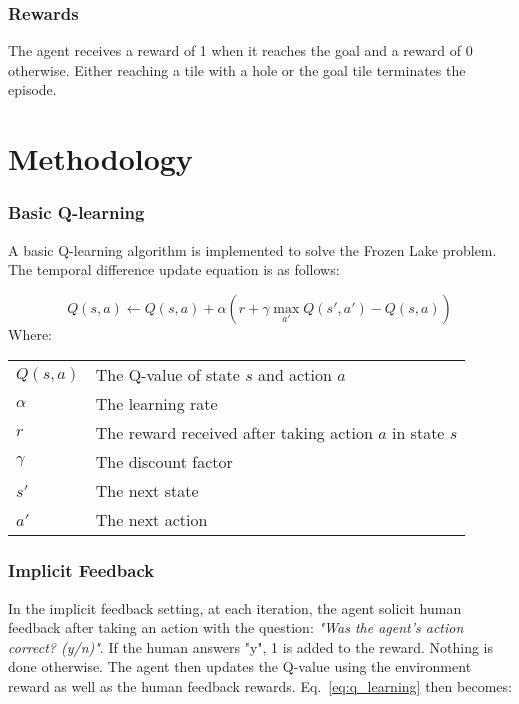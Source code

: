 \documentclass[conference]{IEEEtran}
\makeatletter
\newenvironment{conditions}
  {\par\vspace{\abovedisplayskip}\noindent\begin{tabular}{>{$}l<{$} @{${}={}$} l}}
  {\end{tabular}\par\vspace{\belowdisplayskip}}
\makeatother
\begin{document}
\subsubsection{Rewards}

The agent receives a reward of 1 when it reaches the goal and a reward of 0 otherwise. Either reaching a tile with a hole or the goal tile terminates the episode.

\section{Methodology}

\subsubsection{Basic Q-learning}

A basic Q-learning\cite{watkinsQlearning1992} algorithm is implemented to solve the Frozen Lake problem. The temporal difference update equation is as follows:

\begin{equation}
    Q(s, a) \leftarrow Q(s, a) + \alpha \left( r + \gamma \max_{a'} Q(s', a') - Q(s, a) \right)
    \label{eq:q_learning}
\end{equation}
Where:
\begin{conditions}
    Q(s, a) & The Q-value of state \(s\) and action \(a\) \\
    \alpha  & The learning rate \\
    r       & The reward received after taking action \(a\) in state \(s\) \\
    \gamma  & The discount factor \\
    s'      & The next state \\
    a'      & The next action
\end{conditions}

\subsubsection{Implicit Feedback}

In the implicit feedback setting, at each iteration, the agent solicit human feedback after taking an action with the question: \textit{"Was the agent's action correct? (y/n)"}. If the human answers "y", 1 is added to the reward. Nothing is done otherwise. The agent then updates the Q-value using the environment reward as well as the human feedback rewards. Eq.~\ref{eq:q_learning} then becomes:
\end{document}
